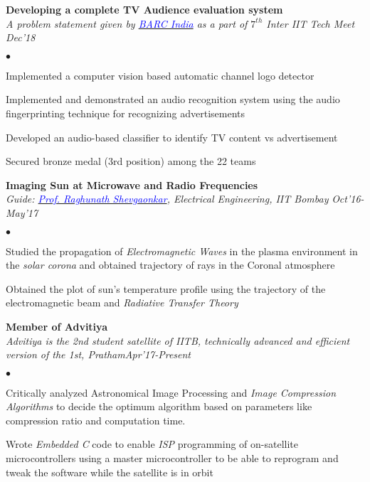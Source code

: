 \documentclass[margin,line]{res}
\newenvironment{list2}{
  \begin{list}{$\bullet$}{%
      \setlength{\itemsep}{0.03in}
      \setlength{\parsep}{0in} \setlength{\parskip}{0in}
      \setlength{\topsep}{0in} \setlength{\partopsep}{0in} 
      \setlength{\leftmargin}{0.2in}}}{\end{list}}
\begin{document}
\begin{resume}
{\bf Developing a complete TV Audience evaluation system} \\
{\em A problem statement given by \href{https://www.barcindia.co.in}{\textcolor{blue}{BARC India}} as a part of $7^{th}$ Inter IIT Tech Meet} \hfill {\it Dec'18}\\
\vspace*{-.13in}
\begin{list2}
\item Implemented a computer vision based automatic channel logo detector
\item Implemented and demonstrated an audio recognition system using the audio fingerprinting technique for recognizing advertisements
\item Developed an audio-based classifier to identify TV content vs advertisement
\item Secured bronze medal (3rd position) among the 22 teams
\end{list2}


{\bf Imaging Sun at Microwave and Radio Frequencies} \\
{\em Guide: \href{https://www.ee.iitb.ac.in/wiki/faculty/rks}{\textcolor{blue}{Prof. Raghunath Shevgaonkar}}, Electrical Engineering, IIT Bombay} \hfill {\it Oct'16-May'17}\\
\vspace*{-.13in}
\begin{list2}
\item Studied the propagation of \emph{Electromagnetic Waves} in the plasma environment in the \emph{solar corona} and obtained trajectory of rays in the Coronal atmosphere
\item Obtained the plot of sun's temperature profile using the trajectory of the electromagnetic beam and \emph{Radiative Transfer Theory}
\end{list2}



{\bf Member of Advitiya} \\
{\em Advitiya is the 2nd student satellite of IITB, technically advanced and efficient version of the 1st, Pratham}{\em \hfill Apr'17-Present} \\
\vspace*{-.13in}
\begin{list2}
\item Critically analyzed Astronomical Image Processing and \emph{Image Compression Algorithms} to decide the optimum algorithm based on parameters like compression ratio and computation time.  
\item Wrote \emph{Embedded C} code to enable \emph{ISP} programming of on-satellite microcontrollers using a master microcontroller to be able to reprogram and tweak the software while the satellite is in orbit  
\end{list2}



\end{resume}
\end{document}

